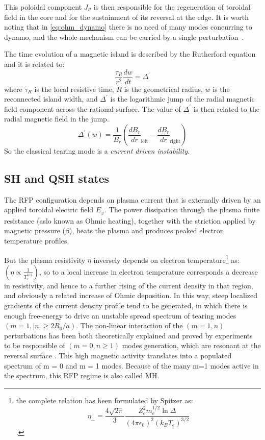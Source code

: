This poloidal component $J_\vartheta$ is then responsible for the regeneration of toroidal field in the core and for the sustainment of its reversal at the edge. It is worth noting that in \eqref{eq:ohm_dynamo} there is no need of many modes concurring to dynamo, and the whole mechanism can be carried by a single perturbation~\cite{Bonomo39}.


The time evolution of a magnetic island is described by the Rutherford equation and it is related to:
\begin{equation}
    \frac{\tau_R}{r^2} \frac{dw}{dt} = \Delta^\prime
\end{equation}
%
where $\tau_R$ is the local resistive time, $R$ is the geometrical radius, $w$ is the reconnected island width, and $\Delta^\prime$ is the logarithmic jump of the radial magnetic field component across the rational surface.
%
The value of $\Delta^\prime$ is then related to the radial magnetic field in the jump.
\begin{equation}
    \Delta^\prime (w) = \frac{1}{B_r} \left( \frac{dB_r}{dr}_\text{left} - \frac{dB_r}{dr}_\text{right} \right)
\end{equation}
%	
So the classical tearing mode is a {\em current driven instability}.

\subsection{SH and QSH states}

The RFP configuration depends on plasma current that is externally driven by an applied toroidal electric field $E_\varphi$. The
power dissipation through the plasma finite resistance (aslo known as Ohmic heating), together with the striction applied by magnetic pressure ($\beta$), heats the plasma and produces peaked electron temperature profiles. 

But the plasma resistivity $\eta$ inversely depends on electron temperature\footnote{the complete relation has been formulated by Spitzer as: $$\eta_\bot  = \frac{4\sqrt{2\pi}}{3} \frac{Z_e^2 m_e^{1/2} \ln{\Delta}}{(4\pi\epsilon_0)^2(k_B T_e)^{3/2}} $$.}
as: $(\eta \propto \frac{1}{T_e^{3/2}})$, so to a local increase in electron temperature corresponds a decrease in resistivity, and hence to a further rising of the current density in that region, and obviously a related increase of Ohmic deposition. In this way, steep localized gradients of the current density profile tend to be generated, in which there is enough free-energy to drive an unstable spread spectrum of tearing modes $(m = 1, |n| \geq 2R_0 /a)$. The non-linear interaction of the $(m = 1, n)$ perturbations has been both theoretically explained and proved by experiments to be responsible of $(m = 0, n \geq 1)$ modes generation, which are resonant at the reversal surface \cite{Bonomo33}. This high magnetic activity translates into a populated spectrum of m = 0 and m = 1 modes.
Because of the many m=1 modes active in the spectrum, this RFP regime is also called \acl{MH}.

